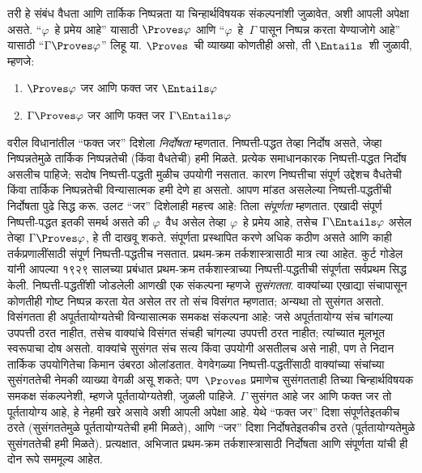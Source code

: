 तरी हे संबंध वैधता आणि तार्किक निष्पन्नता या चिन्हार्थविषयक संकल्पनांशी
जुळावेत, अशी आपली अपेक्षा असते. ``$\varphi$~हे प्रमेय आहे'' यासाठी
$\Proves \varphi$ आणि ``$\varphi$~हे~$\Gamma$ पासून निष्पन्न करता येण्याजोगे आहे'' यासाठी
``$\Gamma \Proves \varphi$'' लिहू या. $\Proves$~ची व्याख्या कोणतीही असो,
ती $\Entails$~शी जुळावी, म्हणजे:
\begin{enumerate}
\item $\Proves \varphi$ जर आणि फक्त जर $\Entails \varphi$
\item $\Gamma \Proves \varphi$ जर आणि फक्त जर $\Gamma \Entails \varphi$
\end{enumerate}
वरील विधानांतील ``फक्त जर'' दिशेला \emph{निर्दोषता} म्हणतात.
निष्पत्ती-पद्धत तेव्हा निर्दोष असते, जेव्हा निष्पन्नतेमुळे
तार्किक निष्पन्नतेची (किंवा वैधतेची) हमी मिळते. प्रत्येक समाधानकारक
निष्पत्ती-पद्धत निर्दोष असलीच पाहिजे; सदोष निष्पत्ती-पद्धती
मुळीच उपयोगी नसतात. कारण निष्पत्तीचा संपूर्ण उद्देशच वैधतेची
किंवा तार्किक निष्पन्नतेची विन्यासात्मक हमी देणे हा असतो. आपण मांडत
असलेल्या निष्पत्ती-पद्धतींची निर्दोषता पुढे सिद्ध करू.
उलट ``जर'' दिशेलाही महत्त्व आहे: तिला \emph{संपूर्णता} म्हणतात.
एखादी संपूर्ण निष्पत्ती-पद्धत इतकी समर्थ असते की $\varphi$~वैध असेल
तेव्हा $\varphi$~हे प्रमेय आहे, तसेच $\Gamma \Entails \varphi$ असेल तेव्हा
$\Gamma \Proves \varphi$, हे ती दाखवू शकते. संपूर्णता प्रस्थापित करणे अधिक
कठीण असते आणि काही तर्कप्रणालींसाठी संपूर्ण निष्पत्ती-पद्धतीच
नसतात. प्रथम-क्रम तर्कशास्त्रासाठी मात्र त्या आहेत. कुर्ट गोडेल यांनी
आपल्या १९२९ सालच्या प्रबंधात प्रथम-क्रम तर्कशास्त्राच्या
निष्पत्ती-पद्धतीची संपूर्णता सर्वप्रथम सिद्ध केली.
निष्पत्ती-पद्धतींशी जोडलेली आणखी एक संकल्पना म्हणजे
\emph{सुसंगतता}. वाक्यांच्या एखाद्या संचापासून कोणतीही गोष्ट
निष्पन्न करता येत असेल तर तो संच विसंगत म्हणतात; अन्यथा तो सुसंगत
असतो. विसंगतता ही अपूर्ततायोग्यतेची विन्यासात्मक समकक्ष संकल्पना आहे:
जसे अपूर्ततायोग्य संच चांगल्या उपपत्ती ठरत नाहीत, तसेच वाक्यांचे
विसंगत संचही चांगल्या उपपत्ती ठरत नाहीत; त्यांच्यात मूलभूत स्वरूपाचा
दोष असतो. वाक्यांचे सुसंगत संच सत्य किंवा उपयोगी असतीलच असे
नाही, पण ते निदान तार्किक उपयोगितेचा किमान उंबरठा ओलांडतात. वेगवेगळ्या
निष्पत्ती-पद्धतींसाठी वाक्यांच्या संचांच्या सुसंगततेची नेमकी
व्याख्या वेगळी असू शकते; पण~$\Proves$ प्रमाणेच सुसंगतताही तिच्या
चिन्हार्थविषयक समकक्ष संकल्पनेशी, म्हणजे पूर्ततायोग्यतेशी, जुळली पाहिजे.
$\Gamma$ सुसंगत आहे जर आणि फक्त जर तो पूर्ततायोग्य आहे, हे नेहमी खरे
असावे अशी आपली अपेक्षा आहे. येथे ``फक्त जर'' दिशा संपूर्णतेइतकीच ठरते
(सुसंगततेमुळे पूर्ततायोग्यतेची हमी मिळते), आणि ``जर'' दिशा
निर्दोषतेइतकीच ठरते (पूर्ततायोग्यतेमुळे सुसंगततेची हमी मिळते).
प्रत्यक्षात, अभिजात प्रथम-क्रम तर्कशास्त्रासाठी निर्दोषता आणि संपूर्णता
यांची ही दोन रूपे सममूल्य आहेत.

